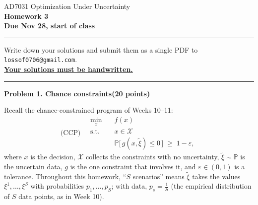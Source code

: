 \documentclass[10pt]{article}
\newcommand{\problem}[2]{%
  \par\bigskip
  {\color{ruleink}\rule{\textwidth}{1pt}}\par\nobreak\vspace{3pt}
  {\large\bfseries #2}\hfill{\normalsize\bfseries(#1 points)}\par\nobreak\vspace{4pt}}
\newcommand{\Prob}{\mathbb{P}}
\begin{document}
\begin{center}
  {\large AD7031 Optimization Under Uncertainty}\\[3pt]
  {\Large\bfseries Homework 3}\\[4pt]
  {\small \textbf{Due Nov 28, start of class}}
\end{center}
\medskip\hrule\medskip

Write down your solutions and submit them as a single PDF to
\texttt{lossof0706@gmail.com}.\\
\textbf{\underline{Your solutions must be handwritten.}}

\problem{20}{Problem 1. Chance constraints}

Recall the chance-constrained program of Weeks 10--11:
\begin{equation}
\label{eq:ccp}
\text{(CCP)} \quad
\begin{aligned}
  \min_{x} \quad & f(x) \\
  \text{s.t.} \quad & x \in \mathcal{X} \\
                    & \Prob\big[\, g(x, \tilde\xi) \le 0 \,\big] \;\ge\; 1 - \varepsilon ,
\end{aligned}
\end{equation}
where $x$ is the decision, $\mathcal{X}$ collects the constraints with no uncertainty, $\tilde\xi \sim \mathbb{P}$ is the
uncertain data, $g$ is the one constraint that involves it, and $\varepsilon \in (0,1)$ is a tolerance.
Throughout this homework, ``$S$ scenarios'' means $\tilde\xi$ takes the values $\xi^1, \dots, \xi^S$ with
probabilities $p_1, \dots, p_S$; with data, $p_s = \tfrac1S$ (the empirical distribution of $S$ data points, as in Week 10).
\end{document}
